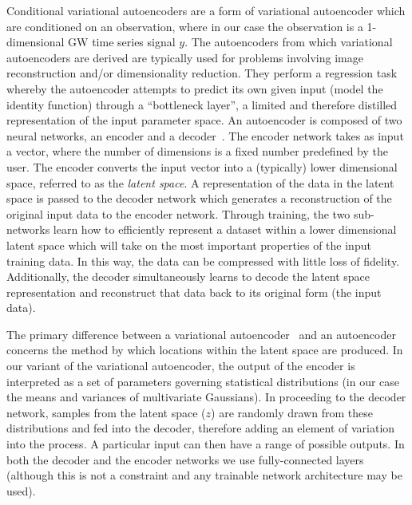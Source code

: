 %
%
Conditional variational autoencoders are a form of variational autoencoder
which are conditioned on an observation, where in our case the observation is a
1-dimensional \ac{GW} time series signal $y$. The autoencoders from which
variational autoencoders are derived are typically used for problems involving
image reconstruction and/or dimensionality reduction. They perform a regression
task whereby the autoencoder attempts to predict its own given input (model the
identity function) through a ``bottleneck layer'', a limited  and therefore distilled representation of
the input parameter space. An autoencoder is composed of two neural networks,
an encoder and a decoder~\cite{gallinari1987memoires}. %
The encoder network takes as
input a vector, where the number of dimensions is a fixed number predefined by
the user. The encoder converts the input vector into a (typically) lower
dimensional space, referred to as the {\it{latent space}}. A representation of
the data in the latent space is passed to the decoder network which generates a
reconstruction of the original input data to the encoder network. Through
training, the two sub-networks learn how to efficiently represent a dataset
within a lower dimensional latent space which will take on the most important
properties of the input training data. In this way, the data can be compressed
with little loss of fidelity. Additionally, the decoder simultaneously learns
to decode the latent space representation and reconstruct that data back to its
original form (the input data).

%
%
The primary difference between a variational autoencoder~\cite{1812.04405} and
an autoencoder concerns the method by which locations within the latent space
are produced. In our variant of the variational autoencoder, the output of the
encoder is interpreted as a set of parameters governing statistical
distributions (in our case the means and variances of multivariate Gaussians).
In proceeding to the decoder network, samples from the latent space ($z$) are
randomly drawn from these distributions and fed into the decoder, therefore
adding an element of variation into the process. A particular input can then
have a range of possible outputs. In both the decoder and the encoder networks
we use fully-connected layers (although this is not a constraint and any
trainable network architecture may be used).

